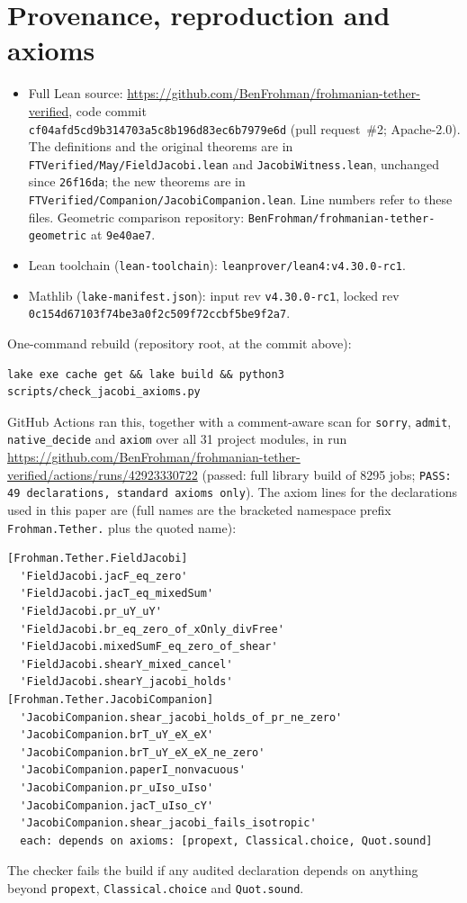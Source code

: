 \documentclass[11pt]{article}\emergencystretch=2em
\theoremstyle{definition}\newtheorem{definition}[theorem]{Definition}\theoremstyle{remark}\newtheorem{remark}[theorem]{Remark}
\begin{document}
\section{Provenance, reproduction and axioms}
\begin{itemize}
\item Full Lean source: \url{https://github.com/BenFrohman/frohmanian-tether-verified}, code commit\\ \nolinkurl{cf04afd5cd9b314703a5c8b196d83ec6b7979e6d} (pull request~\#2; Apache-2.0). The definitions and the original theorems are in \nolinkurl{FTVerified/May/FieldJacobi.lean} and \nolinkurl{JacobiWitness.lean}, unchanged since \texttt{26f16da}; the new theorems are in \nolinkurl{FTVerified/Companion/JacobiCompanion.lean}. Line numbers refer to these files. Geometric comparison repository: \texttt{BenFrohman/frohmanian-tether-geometric} at \texttt{9e40ae7}.
\item Lean toolchain (\texttt{lean-toolchain}): \texttt{leanprover/lean4:v4.30.0-rc1}.
\item Mathlib (\texttt{lake-manifest.json}): input rev \texttt{v4.30.0-rc1}, locked rev\\ \texttt{0c154d67103f74be3a0f2c509f72ccbf5be9f2a7}.
\end{itemize}
One-command rebuild (repository root, at the commit above):
\begin{verbatim}
lake exe cache get && lake build && python3 scripts/check_jacobi_axioms.py
\end{verbatim}
GitHub Actions ran this, together with a comment-aware scan for \texttt{sorry}, \texttt{admit}, \texttt{native\_decide} and \texttt{axiom} over all 31 project modules, in run\\ \url{https://github.com/BenFrohman/frohmanian-tether-verified/actions/runs/42923330722} (passed: full library build of 8295 jobs; \texttt{PASS: 49 declarations, standard axioms only}). The axiom lines for the declarations used in this paper are (full names are the bracketed namespace prefix \texttt{Frohman.Tether.} plus the quoted name):
{\footnotesize\begin{verbatim}
[Frohman.Tether.FieldJacobi]
  'FieldJacobi.jacF_eq_zero'
  'FieldJacobi.jacT_eq_mixedSum'
  'FieldJacobi.pr_uY_uY'
  'FieldJacobi.br_eq_zero_of_xOnly_divFree'
  'FieldJacobi.mixedSumF_eq_zero_of_shear'
  'FieldJacobi.shearY_mixed_cancel'
  'FieldJacobi.shearY_jacobi_holds'
[Frohman.Tether.JacobiCompanion]
  'JacobiCompanion.shear_jacobi_holds_of_pr_ne_zero'
  'JacobiCompanion.brT_uY_eX_eX'
  'JacobiCompanion.brT_uY_eX_eX_ne_zero'
  'JacobiCompanion.paperI_nonvacuous'
  'JacobiCompanion.pr_uIso_uIso'
  'JacobiCompanion.jacT_uIso_cY'
  'JacobiCompanion.shear_jacobi_fails_isotropic'
  each: depends on axioms: [propext, Classical.choice, Quot.sound]
\end{verbatim}}
\noindent The checker fails the build if any audited declaration depends on anything beyond \texttt{propext}, \texttt{Classical.choice} and \texttt{Quot.sound}.
\end{document}
